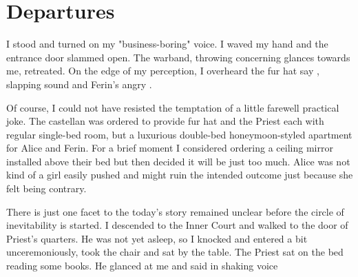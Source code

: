 \section{Departures}

I stood and turned on my "business-boring" voice.  I waved my hand and the entrance door slammed open. The warband, throwing concerning glances towards me, retreated. On the edge of my perception, I overheard the fur hat say , slapping sound and Ferin's angry .

Of course, I could not have resisted the temptation of a little farewell practical joke. The castellan was ordered to provide fur hat and the Priest each with regular single-bed room, but a luxurious double-bed honeymoon-styled apartment for Alice and Ferin. For a brief moment I considered ordering a ceiling mirror installed above their bed but then decided it will be just too much. Alice was not kind of a girl easily pushed and might ruin the intended outcome just because she felt being contrary.

There is just one facet to the today's story remained unclear before the circle of inevitability is started. I descended to the Inner Court and walked to the door of Priest's quarters. He was not yet asleep, so I knocked and entered a bit unceremoniously, took the chair and sat by the table. The Priest sat on the bed reading some books. He glanced at me and said in shaking voice




